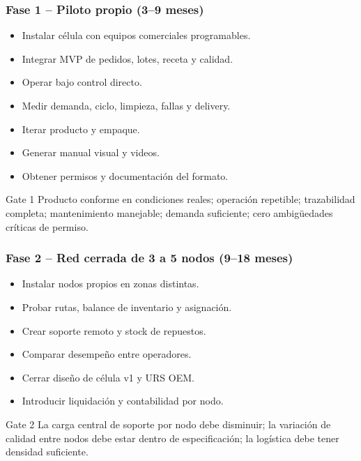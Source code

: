 \documentclass[11pt,a4paper]{article}
\begin{document}
\subsubsection*{Fase 1 -- Piloto propio (3--9 meses)}
\begin{itemize}
\item Instalar célula con equipos comerciales programables.
\item Integrar MVP de pedidos, lotes, receta y calidad.
\item Operar bajo control directo.
\item Medir demanda, ciclo, limpieza, fallas y delivery.
\item Iterar producto y empaque.
\item Generar manual visual y videos.
\item Obtener permisos y documentación del formato.
\end{itemize}
\begin{caja}{Gate 1}
Producto conforme en condiciones reales; operación repetible; trazabilidad completa; mantenimiento
manejable; demanda suficiente; cero ambigüedades críticas de permiso.
\end{caja}

\subsubsection*{Fase 2 -- Red cerrada de 3 a 5 nodos (9--18 meses)}
\begin{itemize}
\item Instalar nodos propios en zonas distintas.
\item Probar rutas, balance de inventario y asignación.
\item Crear soporte remoto y stock de repuestos.
\item Comparar desempeño entre operadores.
\item Cerrar diseño de célula v1 y URS OEM.
\item Introducir liquidación y contabilidad por nodo.
\end{itemize}
\begin{caja}{Gate 2}
La carga central de soporte por nodo debe disminuir; la variación de calidad entre nodos debe estar
dentro de especificación; la logística debe tener densidad suficiente.
\end{caja}
\end{document}
